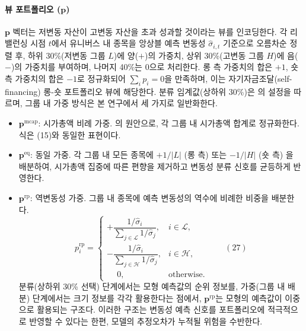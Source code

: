 \documentclass{article}
\begin{document}
\paragraph{뷰 포트폴리오 ($\mathbf{p}$)}

$\mathbf{p}$ 벡터는 저변동 자산이 고변동 자산을 초과 성과할 것이라는 뷰를 인코딩한다. 각 리밸런싱 시점 $t$에서 유니버스 내 종목을 앙상블 예측 변동성 $\hat{\sigma}_{i,t}$ 기준으로 오름차순 정렬 후, 하위 30\%(저변동 그룹 $L$)에 양($+$)의 가중치, 상위 30\%(고변동 그룹 $H$)에 음($-$)의 가중치를 부여하며, 나머지 40\%는 0으로 처리한다. 롱 측 가중치의 합은 $+1$, 숏 측 가중치의 합은 $-1$로 정규화되어 $\sum_i p_i = 0$을 만족하며, 이는 자기자금조달(self-financing) 롱-숏 포트폴리오 뷰에 해당한다. 분류 임계값(상하위 30\%)은 \citet{pyo2018}의 설정을 따르며, 그룹 내 가중 방식은 본 연구에서 세 가지로 일반화한다.

\begin{itemize}
  \item $\mathbf{p}^{\mathrm{mcap}}$: 시가총액 비례 가중. \citet{pyo2018}의 원안으로, 각 그룹 내 시가총액 합계로 정규화한다. 식은 (15)와 동일한 표현이다.

  \item $\mathbf{p}^{\mathrm{eq}}$: 동일 가중. 각 그룹 내 모든 종목에 $+1/|L|$ (롱 측) 또는 $-1/|H|$ (숏 측) 을 배분하여, 시가총액 집중에 따른 편향을 제거하고 변동성 분류 신호를 균등하게 반영한다.

  \item $\mathbf{p}^{\mathrm{rp}}$: 역변동성 가중. 그룹 내 종목에 예측 변동성의 역수에 비례한 비중을 배분한다.
    \begin{equation}
      p_i^{\mathrm{rp}} =
      \begin{cases}
        +\dfrac{1/\hat{\sigma}_i}{\sum_{j \in \mathcal{L}} 1/\hat{\sigma}_j}, & i \in \mathcal{L}, \\[8pt]
        -\dfrac{1/\hat{\sigma}_i}{\sum_{j \in \mathcal{H}} 1/\hat{\sigma}_j}, & i \in \mathcal{H}, \\[6pt]
        \phantom{+}0, & \text{otherwise}.
      \end{cases} \qquad(27)\end{equation}
    분류(상하위 30\% 선택) 단계에서는 모형 예측값의 순위 정보를, 가중(그룹 내 배분) 단계에서는 크기 정보를 각각 활용한다는 점에서, $\mathbf{p}^{\mathrm{rp}}$는 모형의 예측값이 이중으로 활용되는 구조다. 이러한 구조는 변동성 예측 신호를 포트폴리오에 적극적으로 반영할 수 있다는 한편, 모델의 추정오차가 누적될 위험을 수반한다. 
\end{itemize}
\end{document}

